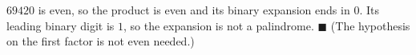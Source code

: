 $69420$ is even, so the product is even and its binary expansion ends in $0$. Its leading binary digit is $1$, so the expansion is not a palindrome. $\blacksquare$ (The hypothesis on the first factor is not even needed.)
